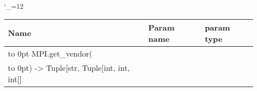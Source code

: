 \begingroup \catcode`\_=12 \tt
\begin{tabular}{lll}
\toprule
\textrm{Name}&\textrm{Param name}&\textrm{param type}\\
\midrule
\hbox to 0pt {MPI.get_vendor(\hss}\\
\hbox to 0pt{) -> Tuple[str, Tuple[int, int, int]]\hss}\\
\bottomrule
\end{tabular}
\endgroup
